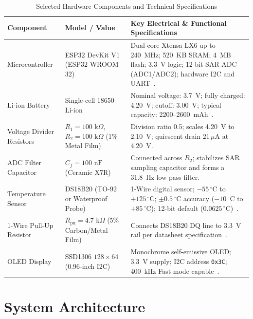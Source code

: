 \documentclass[12pt,a4paper]{article}
\begin{document}
\begin{table}[H]
\centering
\caption{Selected Hardware Components and Technical Specifications}
\label{tab:hw_specs}
\renewcommand{\arraystretch}{1.22}
\begin{tabular}{@{}p{3.2cm}p{3.6cm}p{7.8cm}@{}}
\toprule
\textbf{Component} & \textbf{Model / Value} & \textbf{Key Electrical \& Functional Specifications} \\
\midrule
Microcontroller & ESP32 DevKit V1 (ESP32-WROOM-32) & Dual-core Xtensa LX6 up to 240~MHz; 520~KB SRAM; 4~MB flash; 3.3~V logic; 12-bit SAR ADC (ADC1/ADC2); hardware I2C and UART~\cite{espressif_esp32_ds}. \\
Li-ion Battery & Single-cell 18650 Li-ion & Nominal voltage: 3.7~V; fully charged: 4.20~V; cutoff: 3.00~V; typical capacity: 2200--2600~mAh~\cite{reddy_linden}. \\
Voltage Divider Resistors & $R_1 = 100\text{ k}\Omega$, $R_2 = 100\text{ k}\Omega$ (1\% Metal Film) & Division ratio 0.5; scales 4.20~V to 2.10~V; quiescent drain $21\,\mu\text{A}$ at 4.20~V. \\
ADC Filter Capacitor & $C_f = 100\text{ nF}$ (Ceramic X7R) & Connected across $R_2$; stabilizes SAR sampling capacitor and forms a 31.8~Hz low-pass filter. \\
Temperature Sensor & DS18B20 (TO-92 or Waterproof Probe) & 1-Wire digital sensor; $-55\,^\circ\text{C}$ to $+125\,^\circ\text{C}$; $\pm 0.5\,^\circ\text{C}$ accuracy ($-10\,^\circ\text{C}$ to $+85\,^\circ\text{C}$); 12-bit default ($0.0625\,^\circ\text{C}$)~\cite{analog_ds18b20}. \\
1-Wire Pull-Up Resistor & $R_{\text{pu}} = 4.7\text{ k}\Omega$ (5\% Carbon/Metal Film) & Connects DS18B20 DQ line to 3.3~V rail per datasheet specification~\cite{analog_ds18b20}. \\
OLED Display & SSD1306 $128 \times 64$ (0.96-inch I2C) & Monochrome self-emissive OLED; 3.3~V supply; I2C address \texttt{0x3C}; 400~kHz Fast-mode capable~\cite{solomon_ssd1306}. \\
\bottomrule
\end{tabular}
\end{table}

\section{System Architecture}
\label{sec:system_architecture}
\end{document}
